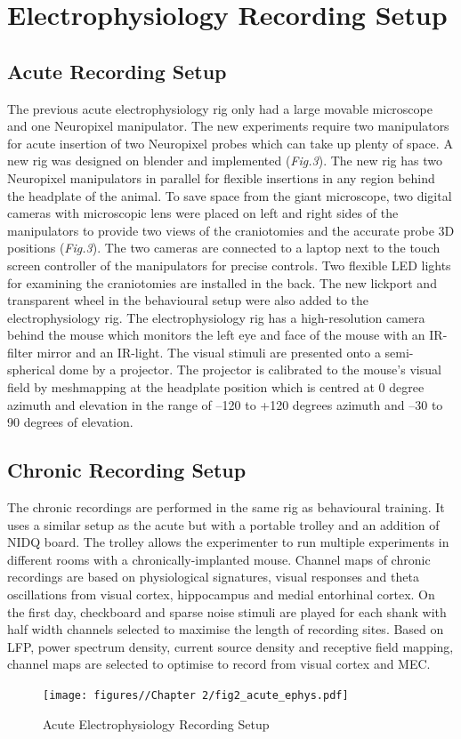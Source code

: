 \section{Electrophysiology Recording Setup}
\subsection{Acute Recording Setup}
The previous acute electrophysiology rig only had a large movable microscope and one Neuropixel manipulator. The new experiments require two manipulators for acute insertion of two Neuropixel probes which can take up plenty of space. A new rig was designed on blender and implemented (\textit{Fig.3}). The new rig has two Neuropixel manipulators in parallel for flexible insertions in any region behind the headplate of the animal. To save space from the giant microscope, two digital cameras with microscopic lens were placed on left and right sides of the manipulators to provide two views of the craniotomies and the accurate probe 3D positions (\textit{Fig.3}). The two cameras are connected to a laptop next to the touch screen controller of the manipulators for precise controls. Two flexible LED lights for examining the craniotomies are installed in the back. The new lickport and transparent wheel in the behavioural setup were also added to the electrophysiology rig. The electrophysiology rig has a high-resolution camera behind the mouse which monitors the left eye and face of the mouse with an IR-filter mirror and an IR-light. The visual stimuli are presented onto a semi-spherical dome by a projector. The projector is calibrated to the mouse’s visual field by meshmapping at the headplate position which is centred at 0 degree azimuth and elevation in the range of –120 to +120 degrees azimuth and –30 to 90 degrees of elevation. 

\subsection{Chronic Recording Setup}
The chronic recordings are performed in the same rig as behavioural training. It uses a similar setup as the acute but with a portable trolley and an addition of NIDQ board. The trolley allows the experimenter to run multiple experiments in different rooms with a chronically-implanted mouse. Channel maps of chronic recordings are based on physiological signatures, visual responses and theta oscillations from visual cortex, hippocampus and medial entorhinal cortex. On the first day, checkboard and sparse noise stimuli are played for each shank with half width channels selected to maximise the length of recording sites. Based on LFP, power spectrum density, current source density and receptive field mapping, channel maps are selected to optimise to record from visual cortex and MEC.
\begin{figure}
    \centering
    \texttt{[image: figures//Chapter 2/fig2\_acute\_ephys.pdf]}
    \caption{Acute Electrophysiology Recording Setup}
    \label{fig:placeholder}
\end{figure}

